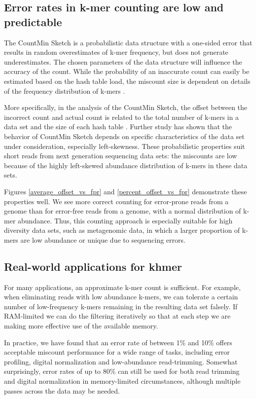 \documentclass{article}
\begin{document}
\subsection{Error rates in k-mer counting are low and predictable}

The CountMin Sketch is a probabilistic data structure with a
one-sided error that results in random overestimates of k-mer
frequency, but does not generate underestimates. The chosen parameters
of the data structure will influence the accuracy of the count.  While
the probability of an inaccurate count can easily be estimated based
on the hash table load, the miscount size is dependent on details of
the frequency distribution of k-mers \cite{Cormode2005}.

More specifically, in the analysis of the CountMin
Sketch, the offset between the incorrect count and
actual count is related to the total number of k-mers in a data set and
the size of each hash table \cite{Cormode2005}. Further study has shown that the behavior
of CountMin Sketch depends on specific characteristics of the data
set under consideration, especially left-skewness\cite{Rusu2008,
  CormodeM05}.  These probabilistic properties suit short reads
from next generation sequencing data sets: the miscounts are
low because of the
highly left-skewed abundance distribution of k-mers in these data sets.

Figures \ref{average_offset_vs_fpr} and \ref{percent_offset_vs_fpr}
demonstrate these properties well.  We see more correct
counting for error-prone reads from a genome than for error-free
reads from a genome, with a normal
distribution of k-mer abundance.  Thus, this counting approach is
especially suitable for high diversity data sets, such as metagenomic
data, in which a larger proportion of k-mers are low abundance or
unique due to sequencing errors.

\subsection{Real-world applications for khmer}

For many applications, an approximate k-mer count is sufficient.  For
example, when eliminating reads with low abundance k-mers, we
can tolerate a certain number of low-frequency k-mers remaining in
the resulting data set falsely.  If RAM-limited we can do the
filtering iteratively so that at each step we are making more
effective use of the available memory.

In practice, we have found that an error rate of between 1\%
and 10\% offers acceptable miscount performance for a wide range of
tasks, including error profiling, digital normalization and
low-abundance read-trimming.  Somewhat surprisingly, error
rates of up to 80\% can still be used for both read trimming and
digital normalization in memory-limited circumstances, although
multiple passes across the data may be needed.
\end{document}
